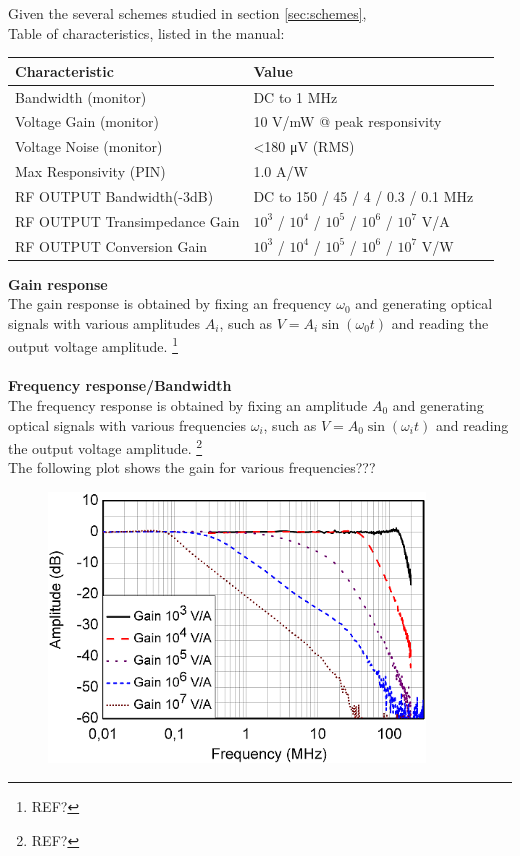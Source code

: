 \begin{bibunit}[plain]
Given the several schemes studied in section \ref{sec:schemes},
%
\\
Table of characteristics, listed in the manual:
\begin{table}[H]
	\centering
	\begin{tabulary}{1.0\textwidth}{|L|L|l|}
		\hline
		\textbf{Characteristic}			& \textbf{Value}\\
		\hline
		Bandwidth (monitor)				& DC to 1 MHz\\
		\hline
		Voltage Gain (monitor)			& 10 V/mW @ peak responsivity\\
		\hline
		Voltage Noise (monitor)			& <180 μV (RMS)\\
		\hline
		Max Responsivity (PIN)			& 1.0 A/W\\
		\hline
		RF OUTPUT Bandwidth(-3dB)		& DC to 150 / 45 / 4 / 0.3 / 0.1 MHz\\
		\hline
		RF OUTPUT Transimpedance Gain	& $10^3$ / $10^4$ / $10^5$ / $10^6$ / $10^7$ V/A\\
		\hline
		RF OUTPUT Conversion Gain		& $10^3$ / $10^4$ / $10^5$ / $10^6$ / $10^7$ V/W\\
		\hline
	\end{tabulary}
\end{table}
\noindent
{\bf Gain response}\\
The gain response is obtained by fixing an frequency $\omega_0$ and generating optical signals with various amplitudes $A_i$, such as $V = A_i \sin \left( \omega_0 t \right)$ and reading the output voltage amplitude.
\footnote{REF?}\\
\\
{\bf Frequency response/Bandwidth}\\
The frequency response is obtained by fixing an amplitude $A_0$ and generating  optical signals with various frequencies $\omega_i$, such as $V = A_0 \sin \left( \omega_i t \right)$ and reading the output voltage amplitude.
\footnote{REF?}
\\
The following plot shows the gain for various frequencies???
\begin{figure}[H]
	\centering
	\includegraphics[width=10cm]{./sdf/optical_detection/figures/thorlabs-manual-gain-spec-rf.png}

\end{figure}
\end{bibunit}
